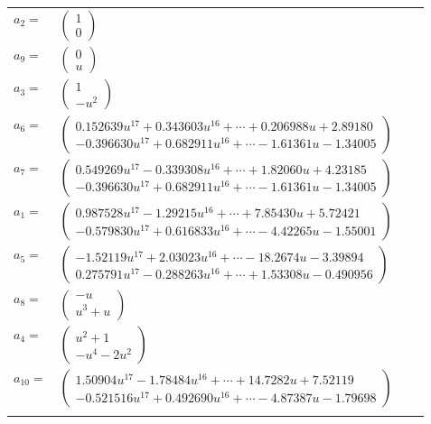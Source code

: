 \documentclass[1p]{elsarticle_modified}
\theoremstyle{definition}
\begin{document}
\begin{tabular}{m{7pt} m{180pt} m{7pt} m{180pt} }
\flushright $a_{2}=$&$\begin{pmatrix}1\\0\end{pmatrix}$ \\
\flushright $a_{9}=$&$\begin{pmatrix}0\\u\end{pmatrix}$ \\
\flushright $a_{3}=$&$\begin{pmatrix}1\\- u^2\end{pmatrix}$ \\
\flushright $a_{6}=$&$\begin{pmatrix}0.152639 u^{17}+0.343603 u^{16}+\cdots+0.206988 u+2.89180\\-0.396630 u^{17}+0.682911 u^{16}+\cdots-1.61361 u-1.34005\end{pmatrix}$ \\
\flushright $a_{7}=$&$\begin{pmatrix}0.549269 u^{17}-0.339308 u^{16}+\cdots+1.82060 u+4.23185\\-0.396630 u^{17}+0.682911 u^{16}+\cdots-1.61361 u-1.34005\end{pmatrix}$ \\
\flushright $a_{1}=$&$\begin{pmatrix}0.987528 u^{17}-1.29215 u^{16}+\cdots+7.85430 u+5.72421\\-0.579830 u^{17}+0.616833 u^{16}+\cdots-4.42265 u-1.55001\end{pmatrix}$ \\
\flushright $a_{5}=$&$\begin{pmatrix}-1.52119 u^{17}+2.03023 u^{16}+\cdots-18.2674 u-3.39894\\0.275791 u^{17}-0.288263 u^{16}+\cdots+1.53308 u-0.490956\end{pmatrix}$ \\
\flushright $a_{8}=$&$\begin{pmatrix}- u\\u^3+u\end{pmatrix}$ \\
\flushright $a_{4}=$&$\begin{pmatrix}u^2+1\\- u^4-2 u^2\end{pmatrix}$ \\
\flushright $a_{10}=$&$\begin{pmatrix}1.50904 u^{17}-1.78484 u^{16}+\cdots+14.7282 u+7.52119\\-0.521516 u^{17}+0.492690 u^{16}+\cdots-4.87387 u-1.79698\end{pmatrix}$\\&\end{tabular}
\end{document}
